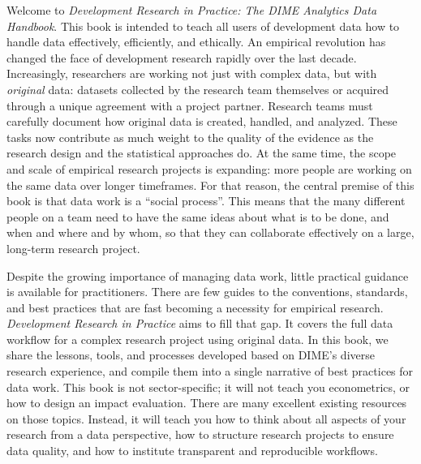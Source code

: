 
Welcome to \textit{Development Research in Practice: The DIME Analytics Data Handbook}.
This book is intended to teach all users of development data
how to handle data effectively, efficiently, and ethically.
An empirical revolution has changed the face of development research rapidly over the last decade.
Increasingly, researchers are working not just with complex data,
but with \textit{original} data:
datasets collected by the research team themselves
or acquired through a unique agreement with a project partner.
Research teams must carefully document how original data is created, handled, and analyzed.
These tasks now contribute as much weight to the quality of the evidence
as the research design and the statistical approaches do.
At the same time, the scope and scale of empirical research projects is expanding:
more people are working on the same data over longer timeframes.
For that reason, the central premise of this book is that data work is a ``social process''.
This means that the many different people on a team need to have the same ideas
about what is to be done, and when and where and by whom,
so that they can collaborate effectively on a large, long-term research project.

Despite the growing importance of managing data work,
little practical guidance is available for practitioners.
There are few guides to the conventions, standards, and best practices
that are fast becoming a necessity for empirical research.
\textit{Development Research in Practice} aims to fill that gap.
It covers the full data workflow for a complex research project using original data.
In this book, we share the lessons, tools, and processes
developed based on DIME's diverse research experience,
and compile them into a single narrative of best practices for data work.
This book is not sector-specific;
it will not teach you econometrics,
or how to design an impact evaluation.
There are many excellent existing resources on those topics.
Instead, it will teach you how to think about all aspects of your research from a data perspective,
how to structure research projects to ensure data quality,
and how to institute transparent and reproducible workflows.





